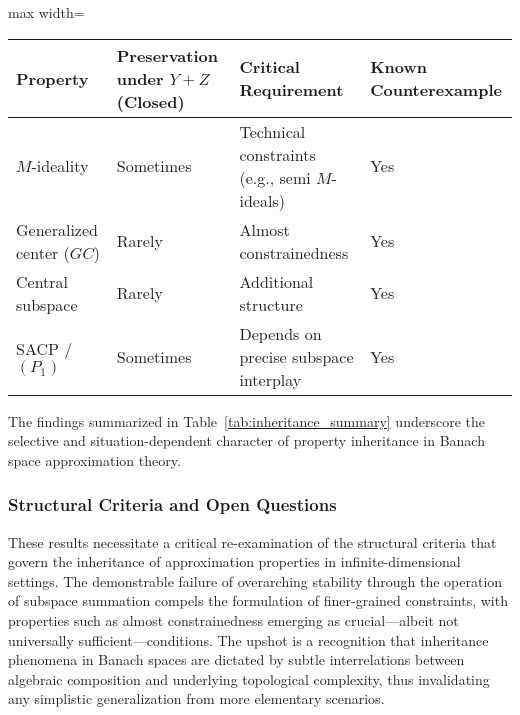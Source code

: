 \begin{table*}[htbp]
\centering
\caption{Summary of Stability and Inheritance for Key Properties under Subspace Sum}
\label{tab:inheritance_summary}
\begin{adjustbox}{max width=\textwidth}
\begin{tabular}{llll}
\toprule
\textbf{Property} & \textbf{Preservation under $Y+Z$ (Closed)} & \textbf{Critical Requirement} & \textbf{Known Counterexample} \\
\midrule
$M$-ideality        & Sometimes                    & Technical constraints (e.g., semi $M$-ideals)   & Yes \\
Generalized center ($GC$)   & Rarely                       & Almost constrainedness                        & Yes \\
Central subspace    & Rarely                       & Additional structure                           & Yes \\
SACP / $(P_1)$      & Sometimes                    & Depends on precise subspace interplay          & Yes \\
\bottomrule
\end{tabular}
\end{adjustbox}
\end{table*}

The findings summarized in Table~\ref{tab:inheritance_summary} underscore the selective and situation-dependent character of property inheritance in Banach space approximation theory.

\subsubsection{Structural Criteria and Open Questions}

These results necessitate a critical re-examination of the structural criteria that govern the inheritance of approximation properties in infinite-dimensional settings. The demonstrable failure of overarching stability through the operation of subspace summation compels the formulation of finer-grained constraints, with properties such as almost constrainedness emerging as crucial—albeit not universally sufficient—conditions. The upshot is a recognition that inheritance phenomena in Banach spaces are dictated by subtle interrelations between algebraic composition and underlying topological complexity, thus invalidating any simplistic generalization from more elementary scenarios.

